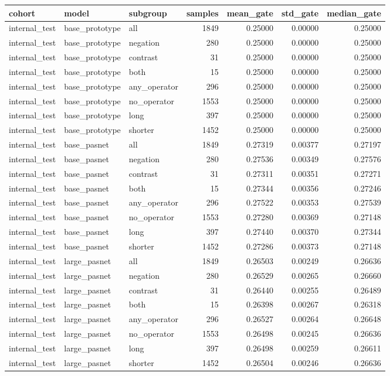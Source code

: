 \begin{tabular}{lllrrrr}
\toprule
cohort & model & subgroup & samples & mean\_gate & std\_gate & median\_gate \\
\midrule
internal\_test & base\_prototype & all & 1849 & 0.25000 & 0.00000 & 0.25000 \\
internal\_test & base\_prototype & negation & 280 & 0.25000 & 0.00000 & 0.25000 \\
internal\_test & base\_prototype & contrast & 31 & 0.25000 & 0.00000 & 0.25000 \\
internal\_test & base\_prototype & both & 15 & 0.25000 & 0.00000 & 0.25000 \\
internal\_test & base\_prototype & any\_operator & 296 & 0.25000 & 0.00000 & 0.25000 \\
internal\_test & base\_prototype & no\_operator & 1553 & 0.25000 & 0.00000 & 0.25000 \\
internal\_test & base\_prototype & long & 397 & 0.25000 & 0.00000 & 0.25000 \\
internal\_test & base\_prototype & shorter & 1452 & 0.25000 & 0.00000 & 0.25000 \\
internal\_test & base\_pasnet & all & 1849 & 0.27319 & 0.00377 & 0.27197 \\
internal\_test & base\_pasnet & negation & 280 & 0.27536 & 0.00349 & 0.27576 \\
internal\_test & base\_pasnet & contrast & 31 & 0.27311 & 0.00351 & 0.27271 \\
internal\_test & base\_pasnet & both & 15 & 0.27344 & 0.00356 & 0.27246 \\
internal\_test & base\_pasnet & any\_operator & 296 & 0.27522 & 0.00353 & 0.27539 \\
internal\_test & base\_pasnet & no\_operator & 1553 & 0.27280 & 0.00369 & 0.27148 \\
internal\_test & base\_pasnet & long & 397 & 0.27440 & 0.00370 & 0.27344 \\
internal\_test & base\_pasnet & shorter & 1452 & 0.27286 & 0.00373 & 0.27148 \\
internal\_test & large\_pasnet & all & 1849 & 0.26503 & 0.00249 & 0.26636 \\
internal\_test & large\_pasnet & negation & 280 & 0.26529 & 0.00265 & 0.26660 \\
internal\_test & large\_pasnet & contrast & 31 & 0.26440 & 0.00255 & 0.26489 \\
internal\_test & large\_pasnet & both & 15 & 0.26398 & 0.00267 & 0.26318 \\
internal\_test & large\_pasnet & any\_operator & 296 & 0.26527 & 0.00264 & 0.26648 \\
internal\_test & large\_pasnet & no\_operator & 1553 & 0.26498 & 0.00245 & 0.26636 \\
internal\_test & large\_pasnet & long & 397 & 0.26498 & 0.00259 & 0.26611 \\
internal\_test & large\_pasnet & shorter & 1452 & 0.26504 & 0.00246 & 0.26636 \\
\bottomrule
\end{tabular}
